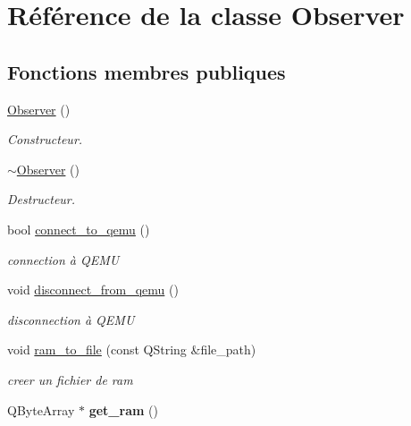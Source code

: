 \hypertarget{classObserver}{
\section{Référence de la classe Observer}
\label{classObserver}
}
\subsection*{Fonctions membres publiques}
\begin{DoxyCompactItemize}
\item 
\hyperlink{classObserver_a19c43f80a38a332a6f694783df3c9835}{Observer} ()
\begin{DoxyCompactList}\small\item\em Constructeur. \item\end{DoxyCompactList}\item 
\hypertarget{classObserver_a450645e61c136826f09940a1334c7f34}{
\hyperlink{classObserver_a450645e61c136826f09940a1334c7f34}{$\sim$Observer} ()}
\label{classObserver_a450645e61c136826f09940a1334c7f34}

\begin{DoxyCompactList}\small\item\em Destructeur. \item\end{DoxyCompactList}\item 
bool \hyperlink{classObserver_ad1d517ca2d4eaca45cc4c3826224bdf0}{connect\_\-to\_\-qemu} ()
\begin{DoxyCompactList}\small\item\em connection à QEMU \item\end{DoxyCompactList}\item 
void \hyperlink{classObserver_af087ba1fc5058af1085cc19dd592dae7}{disconnect\_\-from\_\-qemu} ()
\begin{DoxyCompactList}\small\item\em disconnection à QEMU \item\end{DoxyCompactList}\item 
void \hyperlink{classObserver_a2429a0ceee3eda2e1a51e8696b0063de}{ram\_\-to\_\-file} (const QString \&file\_\-path)
\begin{DoxyCompactList}\small\item\em creer un fichier de ram \item\end{DoxyCompactList}\item 
\hypertarget{classObserver_a94ce174d2c4992ed3145f37f45bf5799}{
QByteArray $\ast$ {\bfseries get\_\-ram} ()}
\label{classObserver_a94ce174d2c4992ed3145f37f45bf5799}


\end{DoxyCompactItemize}
